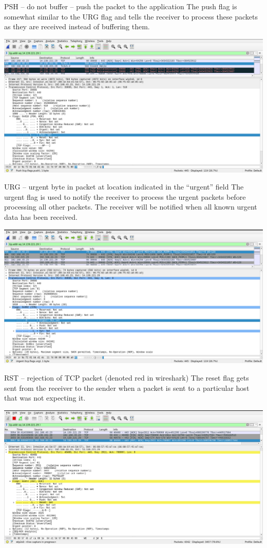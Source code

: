 \documentclass{article}
\begin{document}
\begin{enumerate}
\begin{enumerate}
PSH – do not buffer – push the packet to the application
The push flag is somewhat similar to the URG flag and tells the receiver to process these packets
as they are received instead of buffering them.

\includegraphics[width=700pt]{Question3A4}
\pagebreak

URG – urgent byte in packet at location indicated in the “urgent” field
The urgent flag is used to notify the receiver to process the urgent packets before processing all
other packets. The receiver will be notified when all known urgent data has been received.

\includegraphics[width=700pt]{Question3A5}
\pagebreak

RST – rejection of TCP packet (denoted red in wireshark)
The reset flag gets sent from the receiver to the sender when a packet is sent to a
particular host that was not expecting it.

\includegraphics[width=700pt]{Question3A6}
\pagebreak


\end{enumerate}
\end{enumerate}
\end{document}

